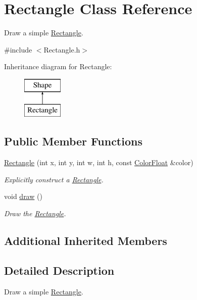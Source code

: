 \hypertarget{class_rectangle}{\section{Rectangle Class Reference}
\label{class_rectangle}
}


Draw a simple \hyperlink{class_rectangle}{Rectangle}.  




{\ttfamily \#include $<$Rectangle.\+h$>$}

Inheritance diagram for Rectangle\+:\begin{figure}[H]
\begin{center}
\leavevmode
\includegraphics[height=2.000000cm]{class_rectangle}
\end{center}
\end{figure}
\subsection*{Public Member Functions}
\begin{DoxyCompactItemize}
\item 
\hyperlink{class_rectangle_aefa6120fd93fe488322280e9abfafde4}{Rectangle} (int x, int y, int w, int h, const \hyperlink{struct_color_float}{Color\+Float} \&color)
\begin{DoxyCompactList}\small\item\em Explicitly construct a \hyperlink{class_rectangle}{Rectangle}. \end{DoxyCompactList}\item 
void \hyperlink{class_rectangle_ac895c67f1d6337e3b4f72663b17dd299}{draw} ()
\begin{DoxyCompactList}\small\item\em Draw the \hyperlink{class_rectangle}{Rectangle}. \end{DoxyCompactList}\end{DoxyCompactItemize}
\subsection*{Additional Inherited Members}


\subsection{Detailed Description}
Draw a simple \hyperlink{class_rectangle}{Rectangle}. 

